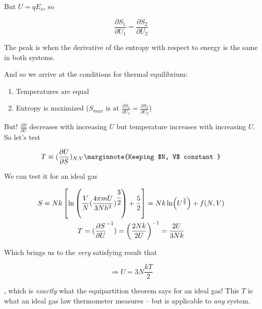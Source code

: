 \documentclass[10pt]{article}
\begin{document}
But $ U = qE_o $, so

\begin{equation}
	\frac{\partial S_1}{\partial U_1} = \frac{\partial S_2}{\partial U_2} 
\end{equation}

The peak is when the derivative of the entropy with respect to energy is the same in both systems.


And so we arrive at the conditions for thermal equilibrium:

\begin{enumerate}
	\item Temperatures are equal
	\item Entropy is maximized ($ S_{max} \text{ is at } \frac{\partial S_1}{\partial U_1} = \frac{\partial S_2}{\partial U_2} $)
\end{enumerate}


But! $ \frac{\partial S}{\partial U}  $ decreases with increasing $ U $  but temperature increases with increasing $ U $. So let's test

\begin{equation}
	T \equiv (\frac{\partial U}{\partial S} )_{N, V}
	\label{eq:294:temp_dfn_entropy}
	\marginnote{Keeping $N, V$ constant }
\end{equation}

We can test it for an ideal gas

\begin{multline}
		S = Nk \left[\ln \left( \frac{V}{N} ( \frac{4\pi m U}{3Nh^2} )^{\cfrac{3}{2}}\right) + \frac{5}{2}  \right]  = Nk\ln(U^{\frac{3}{2}}) + f(N, V) \\
	T = (\frac{\partial S}{\partial U}^{-1}) = \left( \frac{2Nk}{2U}  \right)^{-1} = \frac{2U}{3Nk} \\
\end{multline}

Which brings us to the \textit{very} satisfying result that 

\begin{equation}
	\Rightarrow U = 3N \frac{kT}{2}
\end{equation}

, which is \textit{exactly} what the equipartition theorem says for an ideal gas! This $ T $  is what an ideal gas law thermometer measures -- but is applicable to \textit{any} system.
\end{document}
